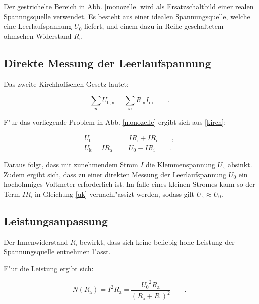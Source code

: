 Der gestrichelte Bereich in Abb. \ref{monozelle} wird als Ersatzschaltbild einer realen Spannngsquelle verwendet.
Es besteht aus einer idealen Spannungsquelle, welche eine Leerlaufspannung $U_\mathrm{0}$ liefert, und einem dazu in Reihe geschaltetem ohmschen Widerstand $R_\mathrm{i}$.

\subsection{Direkte Messung der Leerlaufspannung} %
\label{sub:direkte_messung_der_leerlaufspannung}

Das zweite Kirchhoffschen Gesetz lautet:

\begin{equation}
	\sum_n U_\mathrm{0,n} = \sum_m R_\mathrm{m} I_\mathrm{m} \qquad . \label{kirch}
\end{equation}

F"ur das vorliegende Problem in Abb. \ref{monozelle} ergibt sich aus \eqref{kirch}:

\begin{eqnarray}
	U_\mathrm{0} &=& I R_\mathrm{i} + I R_\mathrm{i} \qquad , \nonumber \\
	U_\mathrm{k} = I R_\mathrm{a} &=& U_\mathrm{0} - I R_\mathrm{i} \qquad . \label{uk}
\end{eqnarray}

Daraus folgt, dass mit zunehmendem Strom $I$ die Klemmenspannung $U_\mathrm{k}$ absinkt.
Zudem ergibt sich, dass zu einer direkten Messung der Leerlaufspannung $U_\mathrm{0}$ ein hochohmiges Voltmeter erforderlich ist. Im falle eines kleinen Stromes kann so der Term $I R_\mathrm{i}$ in Gleichung \eqref{uk} vernachl"assigt werden, sodass gilt $U_\mathrm{k} \approx U_\mathrm{0}$.

\subsection{Leistungsanpassung} %
\label{sub:leistungsanpassung}

Der Innenwiderstand $R_\mathrm{i}$ bewirkt, dass sich keine beliebig hohe Leistung der Spannungsquelle entnehmen l"asst.

F"ur die Leistung ergibt sich:

\begin{equation}
	N(R_\mathrm{a}) = I^2 R_\mathrm{a} = \frac{{U_\mathrm{0} }^2 R_\mathrm{a}}{{(R_\mathrm{a} + R_\mathrm{i})}^2} \qquad . \label{eqn:leistung}
\end{equation}

